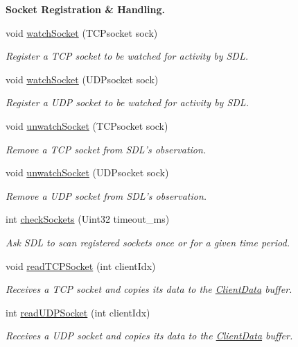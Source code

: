 \begin{Indent}{\bf Socket Registration \& Handling.}\par
\begin{DoxyCompactItemize}
\item 
void \hyperlink{classNetManager_add0bbb27a9593512aa2cff1a353316ac}{watch\-Socket} (T\-C\-Psocket sock)
\begin{DoxyCompactList}\small\item\em Register a T\-C\-P socket to be watched for activity by S\-D\-L. \end{DoxyCompactList}\item 
void \hyperlink{classNetManager_aff38e9c6b4cc21b180d9285ed8ec9ea7}{watch\-Socket} (U\-D\-Psocket sock)
\begin{DoxyCompactList}\small\item\em Register a U\-D\-P socket to be watched for activity by S\-D\-L. \end{DoxyCompactList}\item 
void \hyperlink{classNetManager_a4db6d32d623b5a0a1bda8f3decb6aa6f}{unwatch\-Socket} (T\-C\-Psocket sock)
\begin{DoxyCompactList}\small\item\em Remove a T\-C\-P socket from S\-D\-L's observation. \end{DoxyCompactList}\item 
void \hyperlink{classNetManager_aaa90ba38c3605d8473292c5e7585bd20}{unwatch\-Socket} (U\-D\-Psocket sock)
\begin{DoxyCompactList}\small\item\em Remove a U\-D\-P socket from S\-D\-L's observation. \end{DoxyCompactList}\item 
int \hyperlink{classNetManager_afa6cebf021e8d3444f1904ad22c4e5b7}{check\-Sockets} (Uint32 timeout\-\_\-ms)
\begin{DoxyCompactList}\small\item\em Ask S\-D\-L to scan registered sockets once or for a given time period. \end{DoxyCompactList}\item 
void \hyperlink{classNetManager_a80c34b6f1d22a0db77a6f5063e6d31d9}{read\-T\-C\-P\-Socket} (int client\-Idx)
\begin{DoxyCompactList}\small\item\em Receives a T\-C\-P socket and copies its data to the \hyperlink{structClientData}{Client\-Data} buffer. \end{DoxyCompactList}\item 
int \hyperlink{classNetManager_ade99dd80b1ff980e65d9d0d8d131f903}{read\-U\-D\-P\-Socket} (int client\-Idx)
\begin{DoxyCompactList}\small\item\em Receives a U\-D\-P socket and copies its data to the \hyperlink{structClientData}{Client\-Data} buffer. \end{DoxyCompactList}\end{DoxyCompactItemize}
\end{Indent}
